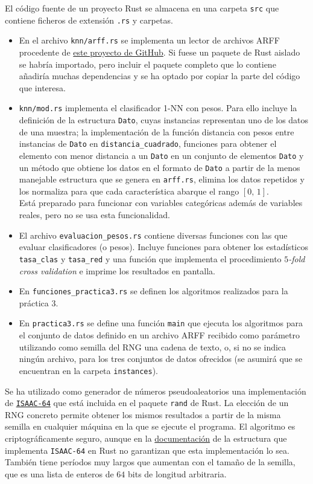 \documentclass{article}
\begin{document}
El código fuente de un proyecto Rust se almacena en una carpeta \texttt{src} que contiene ficheros de extensión \texttt{.rs} y carpetas.

\begin{itemize}
	\item En el archivo \texttt{knn/arff.rs} se implementa un lector de archivos ARFF procedente de \href{https://github.com/gyscos/varf}{este proyecto de GitHub}. Si fuese un paquete de Rust aislado se habría importado, pero incluir el paquete completo que lo contiene añadiría muchas dependencias y se ha optado por copiar la parte del código que interesa.
	\item \texttt{knn/mod.rs} implementa el clasificador 1-NN con pesos. Para ello incluye la definición de la estructura \texttt{Dato}, cuyas instancias representan uno de los datos de una muestra; la implementación de la función distancia con pesos entre instancias de \texttt{Dato} en \texttt{distancia\_cuadrado}, funciones para obtener el elemento con menor distancia a un \texttt{Dato} en un conjunto de elementos \texttt{Dato} y un método que obtiene los datos en el formato de \texttt{Dato} a partir de la menos manejable estructura que se genera en \texttt{arff.rs}, elimina los datos repetidos y los normaliza para que cada característica abarque el rango $[0,\,1]$. \\ Está preparado para funcionar con variables categóricas además de variables reales, pero no se usa esta funcionalidad.
	\item El archivo \texttt{evaluacion\_pesos.rs} contiene diversas funciones con las que evaluar clasificadores (o pesos). Incluye funciones para obtener los estadísticos \texttt{tasa\_clas} y \texttt{tasa\_red} y una función que implementa el procedimiento \textit{$5$-fold cross validation} e imprime los resultados en pantalla.
	\item En \texttt{funciones\_practica3.rs} se definen los algoritmos realizados para la práctica 3.
	\item En \texttt{practica3.rs} se define una función \texttt{main} que ejecuta los algoritmos para el conjunto de datos definido en un archivo ARFF recibido como parámetro utilizando como semilla del RNG una cadena de texto, o, si no se indica ningún archivo, para los tres conjuntos de datos ofrecidos (se asumirá que se encuentran en la carpeta \texttt{instances}).
\end{itemize}

Se ha utilizado como generador de números pseudoaleatorios una implementación de \href{http://www.burtleburtle.net/bob/rand/isaac.html}{\texttt{ISAAC-64}} que está incluida en el paquete \texttt{rand} de Rust. La elección de un RNG concreto permite obtener los mismos resultados a partir de la misma semilla en cualquier máquina en la que se ejecute el programa. El algoritmo es criptográficamente seguro, aunque en la \href{https://docs.rs/rand/0.4.2/rand/struct.Isaac64Rng.html}{documentación} de la estructura que implementa \texttt{ISAAC-64} en Rust no garantizan que esta implementación lo sea. También tiene períodos muy largos que aumentan con el tamaño de la semilla, que es una lista de enteros de $64$ bits de longitud arbitraria. \\
\end{document}
